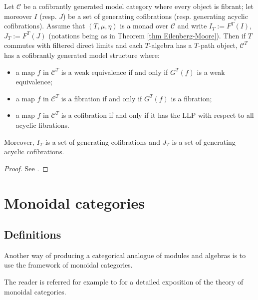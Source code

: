 \begin{refsection}
\begin{thm}
Let $\mathcal C$ be a cofibrantly generated model category where every object is fibrant; let moreover $I$ (resp. $J$) be a set of generating cofibrations  (resp. generating acyclic cofibrations). Assume that $(T, \mu, \eta)$ is a monad over $\mathcal C$ and write $I_T := F^T(I)$, $J_T := F^T(J)$ (notations being as in Theorem \ref{thm Eilenberg-Moore}). Then if $T$ commutes with filtered direct limits and each $T$-algebra has a $T$-path object, $\mathcal C^T$ has a cofibrantly generated model structure where:
\begin{itemize}
\item a map $f$ in $\mathcal C^T$ is a weak equivalence if and only if $G^T(f)$ is a weak equivalence;
\item a map $f$ in $\mathcal C^T$ is a fibration if and only if $G^T(f)$ is a fibration;
\item a map $f$ in $\mathcal C^T$ is a cofibration if and only if it has the LLP with respect to all acyclic fibrations.
\end{itemize}
Moreover, $I_T$ is a set of generating cofibrations and $J_T$ is a set of generating acyclic cofibrations.
\end{thm}

\begin{proof}
See \cite[Lemma 2.3]{schwede}.
\end{proof}

\section{Monoidal categories} \label{monoidal categories}

\subsection{Definitions}

Another way of producing a categorical analogue of modules and algebras is to use the framework of monoidal categories.

The reader is referred for example to \cite[Ch. VII]{cwm} for a detailed exposition of the theory of monoidal categories.


\end{refsection}
